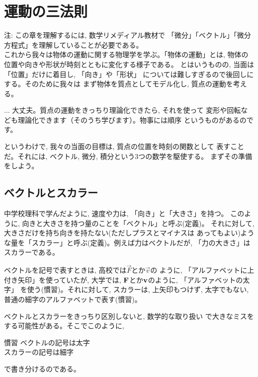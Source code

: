 \chapter{運動の三法則}

{\small 注: この章を理解するには, 数学リメディアル教材で
「微分」「ベクトル」「微分方程式」を理解していることが必要である。}\\

これから我々は物体の運動に関する物理学を学ぶ。「物体の運動」とは, 
物体の位置や向きや形状が時刻とともに変化する様子である。
とはいうものの, 当面は「位置」だけに着目し, 「向き」や「形状」
については難しすぎるので後回しにする。そのために我々は
まず物体を質点としてモデル化し, 質点の運動を考える。

\begin{faq}{\small{}
... 大丈夫。質点の運動をきっちり理論化できたら, それを使って
変形や回転なども理論化できます（そのうち学びます）。物事には順序
というものがあるのです。}\end{faq}

というわけで, 我々の当面の目標は, 質点の位置を時刻の関数として
表すことだ。それには, ベクトル, 微分, 積分という3つの数学を駆使する。
まずその準備をしよう。\\


\section{ベクトルとスカラー}

中学校理科で学んだように, 速度や力は, 「向き」と「大きさ」を持つ。
このように, 向きと大きさを持つ量のことを「ベクトル」と呼ぶ(定義)。
それに対して, 大きさだけを持ち向きを持たない(ただしプラスとマイナスは
あってもよい)ような量を「スカラー」と呼ぶ(定義)。例えば力はベクトルだが, 
「力の大きさ」はスカラーである。

ベクトルを記号で表すときは, 高校では$\vec{F}$とか$\vec{v}$の
ように, 「アルファベットに上付き矢印」を使っていたが, 大学では, 
${\bf F}$とか${\bf v}$のように, 「アルファベットの太字」
を使う(慣習)。それに対して, スカラーは, 上矢印もつけず, 太字でもない, 
普通の細字のアルファベットで表す(慣習)。

ベクトルとスカラーをきっちり区別しないと, 数学的な取り扱い
で大きなミスをする可能性がある。そこでこのように, 
\begin{itembox}{慣習}
ベクトルの記号は太字\\
スカラーの記号は細字
\end{itembox}
で書き分けるのである。

